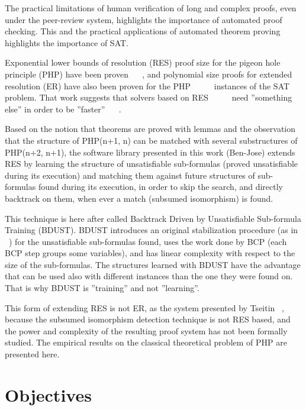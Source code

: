 \documentclass{easychair}
\begin{document}
The practical limitations of human verification of long and complex proofs, even under the peer-review system, highlights the importance of automated proof checking. This and the practical applications of automated theorem proving highlights the importance of SAT.

Exponential lower bounds of resolution (RES) proof size for the pigeon hole principle (PHP) have been proven ~\cite{haken-85} ~\cite{buss-88}, and polynomial size proofs for extended resolution (ER) have also been proven for the PHP  ~\cite{cook-76} ~\cite{cook-79} ~\cite{jarvisalo-07} instances of the SAT problem. That work suggests that solvers based on RES ~\cite{silva-95} ~\cite{moskewicz-01} ~\cite{een-04} need ''something else'' in order to be ''faster'' ~\cite{dixon-04} ~\cite{audemard-10}. 

Based on the notion that theorems are proved with lemmas and the observation that the structure of PHP(n+1, n) can be matched with several substructures of PHP(n+2, n+1), the software library presented in this work (Ben-Jose) extends RES by learning the structure of unsatisfiable sub-formulas (proved unsatisfiable during its execution) and matching them against future structures of sub-formulas found during its execution, in order to skip the search, and directly backtrack on them, when ever a match (subsumed isomorphism) is found. 

This technique is here after called Backtrack Driven by Unsatisfiable Sub-formula Training (BDUST). BDUST introduces an original stabilization procedure (as in ~\cite{bastert-02}) for the unsatisfiable sub-formulas found, uses the work done by BCP (each BCP step groups some variables), and has linear complexity with respect to the size of the sub-formulas. The structures learned with BDUST have the advantage that can be used also with different instances than the one they were found on. That is why BDUST is ''training'' and not ''learning''.

This form of extending RES is not ER, as the system presented by Tseitin ~\cite{tseitin-83}, because the subsumed isomorphism detection technique is not RES based, and the power and complexity of the resulting proof system has not been formally studied. The empirical results on the classical theoretical problem of PHP are presented here. 

\section{Objectives}
\label{sect:objectives}
\end{document}
